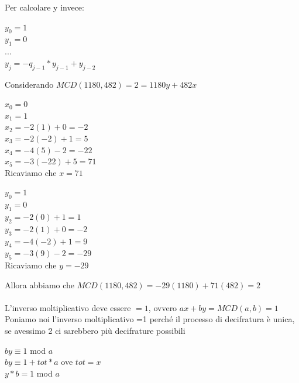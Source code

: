 \documentclass[11pt, oneside]{article}   	%
\begin{document}
Per calcolare y invece: \begin{center}
$y_0 = 1$\\
$y_1 = 0$\\
...\\
$y_j = -q_{j-1}*y_{j-1}+y_{j-2}$
\end{center}
Considerando $MCD(1180,482) = 2 = 1180y+482x$
\begin{center}
$x_0 = 0$\\
$x_1 = 1$\\
$x_2 = -2(1)+0 = -2$\\
$x_3 = -2(-2)+1= 5$\\
$x_4 = -4(5)-2 = -22$\\
$x_5 = -3(-22)+5 = 71$\\
Ricaviamo che $x = 71$\\
\end{center}
\begin{center}
$y_0 = 1$\\
$y_1 = 0$\\
$y_2 = -2(0)+1 = 1$\\
$y_3 = -2(1)+0= -2$\\
$y_4 = -4(-2)+1 = 9$\\
$y_5 = -3(9)-2 = -29$\\
Ricaviamo che $y=-29$
\end{center}
Allora abbiamo che $MCD(1180,482) = -29(1180) + 71(482) = 2$\\\\
L'inverso moltiplicativo deve essere $= 1$, ovvero $ax+by =MCD(a,b)=1$
Poniamo noi l'inverso moltiplicativo =1 perché il processo di decifratura è unica, se avessimo 2 ci sarebbero più decifrature possibili
\begin{center}
$by \equiv 1$ mod $a$\\
$by \equiv 1 + tot * a$ ove $tot = x$\\
$y*b = 1$ mod $a$
\end{center}
\end{document}
